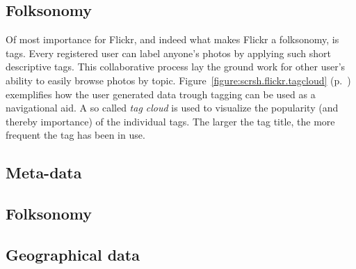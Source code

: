 \subsection{Folksonomy}
Of most importance
for Flickr, and indeed what makes Flickr a folksonomy, is tags. Every
registered user can label anyone's photos by applying such short descriptive
tags. This collaborative process lay the ground work for other user's ability
to easily browse photos by topic.
Figure~\ref{figure:scrsh.flickr.tagcloud}
(p.~\pageref{figure:scrsh.flickr.tagcloud}) exemplifies how the user generated
data trough tagging can be used as a navigational aid. A so called \emph{tag
cloud} is used to visualize the popularity (and thereby importance) of the
individual tags. The larger the tag title, the more frequent the tag has been
in use.


\subsection{Meta-data}

\subsection{Folksonomy}

\subsection{Geographical data}


